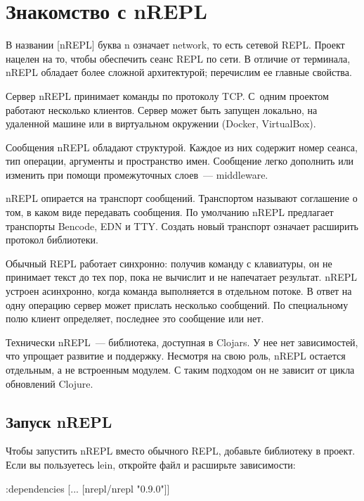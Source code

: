 \section{Знакомство с nREPL}

\def\urlnreplorg{https://nrepl.org}

В названии \footurl{nREPL}{\urlnreplorg}[nREPL] буква n означает network, то есть сетевой REPL. Проект нацелен на то, чтобы обеспечить сеанс REPL по сети. В отличие от терминала, nREPL обладает более сложной архитектурой; перечислим ее главные свойства.

Сервер nREPL принимает команды по протоколу TCP. С~одним проектом работают несколько клиентов. Сервер может быть запущен локально, на удаленной машине или в виртуальном окружении (Docker, VirtualBox).

Сообщения nREPL обладают структурой. Каждое из них содержит номер сеанса, тип операции, аргументы и пространство имен. Сообщение легко дополнить или изменить при помощи промежуточных слоев~--- middleware.

nREPL опирается на транспорт сообщений. Транспортом называют соглашение о том, в каком виде передавать сообщения. По умолчанию nREPL предлагает транспорты Bencode, EDN и TTY. Создать новый транспорт означает расширить протокол библиотеки.

Обычный REPL работает синхронно: получив команду с клавиатуры, он не принимает текст до тех пор, пока не вычислит и не напечатает результат. nREPL устроен асинхронно, когда команда выполняется в отдельном потоке. В ответ на одну операцию сервер может прислать несколько сообщений. По специальному полю клиент определяет, последнее это сообщение или нет.

Технически nREPL~--- библиотека, доступная в Clojars. У нее нет зависимостей, что упрощает развитие и поддержку. Несмотря на свою роль, nREPL остается отдельным, а не встроенным модулем. С таким подходом он не зависит от цикла обновлений Clojure.

\subsection{Запуск nREPL}

Чтобы запустить nREPL вместо обычного REPL, добавьте библиотеку в проект. Если вы пользуетесь lein, откройте файл  и расширьте зависимости:

\begin{english}
  \begin{clojure}
{:dependencies
 [... [nrepl/nrepl "0.9.0"]]}
  \end{clojure}
\end{english}

